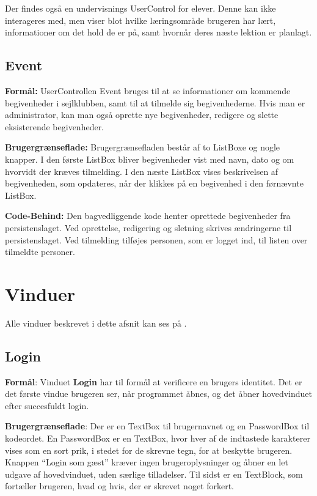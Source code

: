 Der findes også en undervisnings UserControl for elever. 
Denne kan ikke interageres med, men viser blot hvilke læringsområde brugeren har lært, informationer om det hold de er på, samt hvornår deres næste lektion er planlagt.

\subsection{Event}
\textbf{Formål:}
UserControllen Event bruges til at se informationer om kommende begivenheder i sejlklubben, samt til at tilmelde sig begivenhederne. 
Hvis man er administrator, kan man også oprette nye begivenheder, redigere og slette eksisterende begivenheder.

\textbf{Brugergrænseflade:}
Brugergrænsefladen består af to ListBoxe og nogle knapper.
I den første ListBox bliver begivenheder vist med navn, dato og om hvorvidt der kræves tilmelding.
I den næste ListBox vises beskrivelsen af begivenheden, som opdateres, når der klikkes på en begivenhed i den førnævnte ListBox. 

\textbf{Code-Behind:}
Den bagvedliggende kode henter oprettede begivenheder fra persistenslaget. 
Ved oprettelse, redigering og sletning skrives ændringerne til persistenslaget. 
Ved tilmelding tilføjes personen, som er logget ind, til listen over tilmeldte personer.

\section{Vinduer}
Alle vinduer beskrevet i dette afsnit kan ses på . 
\subsection{Login}
 
\textbf{Formål}:
Vinduet \textbf{Login} har til formål at verificere en brugers identitet. 
Det er det første vindue brugeren ser, når programmet åbnes, og det åbner hovedvinduet efter succesfuldt login.
 
\textbf{Brugergrænseflade}:
Der er en TextBox til brugernavnet og en PasswordBox til kodeordet.
En PasswordBox er en TextBox, hvor hver af de indtastede karakterer vises som en sort prik, i stedet for de skrevne tegn, for at beskytte brugeren.
Knappen ``Login som gæst'' kræver ingen brugeroplysninger og åbner en let udgave af hovedvinduet, uden særlige tilladelser.
Til sidst er en TextBlock, som fortæller brugeren, hvad og hvis, der er skrevet noget forkert.


